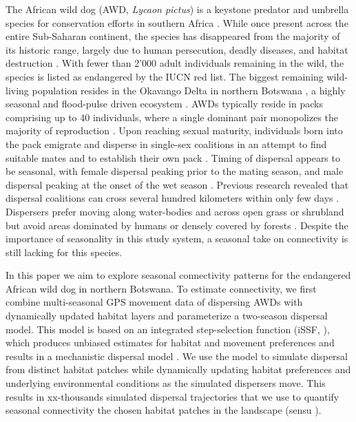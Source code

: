 \documentclass[abstract=on,10pt,a4paper,bibliography=totocnumbered]{article}
\begin{document}
The African wild dog (AWD, \textit{Lycaon pictus}) is a keystone predator and
umbrella species for conservation efforts in southern Africa
\citep{Dalerum.2008}. While once present across the entire Sub-Saharan
continent, the species has disappeared from the majority of its historic range,
largely due to human persecution, deadly diseases, and habitat destruction
\citep{Woodroffe.2020a}. With fewer than 2'000 adult individuals remaining in the
wild, the species is listed as endangered by the IUCN red list. The biggest
remaining wild-living population resides in the Okavango Delta in northern
Botswana \citep{McNutt.1996, Woodroffe.2020a}, a highly seasonal and flood-pulse
driven ecosystem \citep{Wolski.2017}. AWDs typically reside in packs comprising
up to 40 individuals, where a single dominant pair monopolizes the majority of
reproduction \citep{Frame.1979, Malcolm.1982}. Upon reaching sexual maturity,
individuals born into the pack emigrate and disperse in single-sex coalitions in
an attempt to find suitable mates and to establish their own pack
\citep{McNutt.1996}. Timing of dispersal appears to be seasonal, with female
dispersal peaking prior to the mating season, and male dispersal peaking at the
onset of the wet season \citep{Behr.2020}. Previous research revealed that
dispersal coalitions can cross several hundred kilometers within only few days
\citep{Davies-Mostert.2012, Masenga.2016, Cozzi.2020}. Dispersers prefer moving
along water-bodies and across open grass or shrubland but avoid areas dominated
by humans or densely covered by forests \citep{ONeill.2020, Hofmann.2021}.
Despite the importance of seasonality in this study system, a seasonal take on
connectivity is still lacking for this species.

In this paper we aim to explore seasonal connectivity patterns for the
endangered African wild dog in northern Botswana. To estimate connectivity, we
first combine multi-seasonal GPS movement data of dispersing AWDs with
dynamically updated habitat layers and parameterize a two-season dispersal
model. This model is based on an integrated step-selection function (iSSF,
\citealp{Avgar.2016}), which produces unbiased estimates for habitat and
movement preferences and results in a mechanistic dispersal model
\citep{Avgar.2016, Signer.2017}. We use the model to simulate dispersal from
distinct habitat patches while dynamically updating habitat preferences and
underlying environmental conditions as the simulated dispersers move. This
results in xx-thousands simulated dispersal trajectories that we use to quantify
seasonal connectivity the chosen habitat patches in the landscape (sensu
\citealp{Hofmann.2023}).
\end{document}
